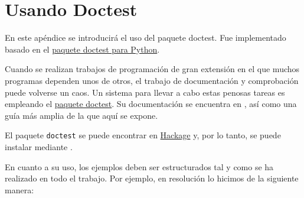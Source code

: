 \chapter{Usando Doctest}\label{aped.B}

En este apéndice se introducirá el uso del paquete doctest. Fue implementado
basado en el \href{https://docs.python.org/3/library/doctest.html}{paquete doctest para Python}.

Cuando se realizan trabajos de programación de gran extensión en el que muchos programas
dependen unos de otros, el trabajo de documentación y comprobación puede volverse un caos.
Un sistema para llevar a cabo estas penosas tareas es empleando el \href{https://hackage.haskell.org/package/doctest}{paquete doctest}. Su documentación se encuentra en \cite{DoctestDoc}, así como una guía más amplia de la que aquí se expone.


El paquete \texttt{doctest} se puede encontrar en \href{http://hackage.haskell.org/package/doctest}{Hackage} y, por lo tanto, se puede instalar mediante .

En cuanto a su uso, los ejemplos deben ser estructurados tal y como se ha realizado en todo el trabajo. Por ejemplo, en resolución lo hicimos de la siguiente manera:

